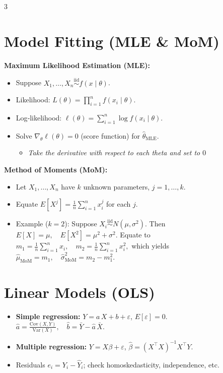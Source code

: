 \documentclass[10pt,landscape]{article}
\begin{document}
\begin{multicols}{3}
\section{Model Fitting (MLE \& MoM)}

\textbf{Maximum Likelihood Estimation (MLE):}
\begin{itemize}
  \item Suppose $X_1,\dots,X_n \overset{\text{iid}}{\sim} f(x\mid \theta)$.
  \item Likelihood: $\displaystyle L(\theta)=\prod_{i=1}^n f(x_i\mid \theta)$.
  \item Log‐likelihood: $\displaystyle \ell(\theta)=\sum_{i=1}^n \log f(x_i\mid \theta)$.
  \item Solve $\displaystyle \nabla_\theta \ell(\theta)=0$ (score function) for $\hat\theta_{\mathrm{MLE}}$.
  \begin{itemize}
    \item \textit{Take the derivative with respect to each theta and set to $0$}
  \end{itemize}
\end{itemize}

\vspace{0.2em}
\textbf{Method of Moments (MoM):}
\begin{itemize}
  \item Let $X_1,\dots,X_n$ have $k$ unknown parameters, $j = 1, \dots, k$.
  \item Equate $\displaystyle E[X^j] = \tfrac{1}{n}\sum_{i=1}^n x_i^j$ for each $j$.
  \item Example ($k=2$): Suppose $X_i \overset{\text{iid}}{\sim} N(\mu,\sigma^2)$. Then $\displaystyle E[X] = \mu, \quad E[X^2] = \mu^2 + \sigma^2.$ Equate to $\displaystyle m_1 = \tfrac{1}{n}\sum_{i=1}^n x_i, \quad m_2 = \tfrac{1}{n}\sum_{i=1}^n x_i^2,$ which yields $\displaystyle \hat{\mu}_{\mathrm{MoM}} = m_1, \quad \hat{\sigma}^2_{\mathrm{MoM}} = m_2 - m_1^2.$
\end{itemize}

\section{Linear Models (OLS)}
\begin{itemize}
  \item \textbf{Simple regression:} $Y = a\,X + b + \varepsilon$, $E[\varepsilon]=0$. $\displaystyle \hat a = \frac{\mathrm{Cov}(X,Y)}{\mathrm{Var}(X)},\quad \hat b = \bar Y - \hat a\,\bar X.$
  \item \textbf{Multiple regression:} $Y = X\beta + \varepsilon$, $\displaystyle \hat\beta = (X^\top X)^{-1} X^\top Y.$
  \item Residuals $e_i=Y_i - \hat Y_i$; check homoskedasticity, independence, etc.
\end{itemize}


\end{multicols}
\end{document}
